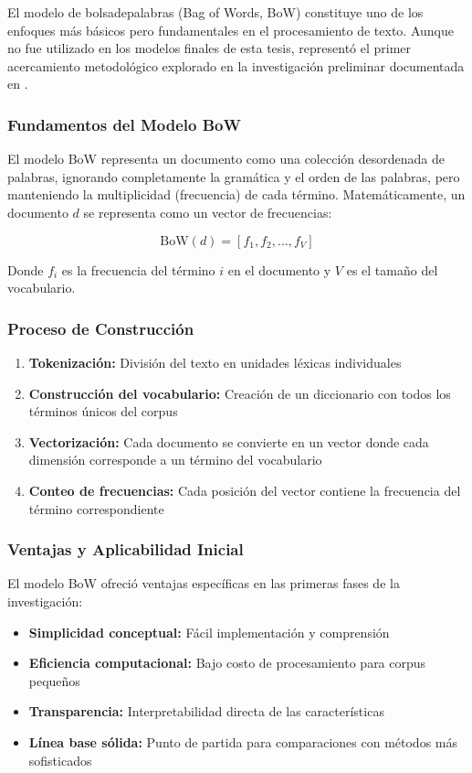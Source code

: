 El modelo de \gls{bolsadepalabras} (Bag of Words, BoW) constituye uno de los enfoques más básicos pero fundamentales en el procesamiento de texto. Aunque no fue utilizado en los modelos finales de esta tesis, representó el primer acercamiento metodológico explorado en la investigación preliminar documentada en \cite{hurtado2024calibracion}.

\subsubsection{Fundamentos del Modelo BoW}

El modelo BoW representa un documento como una colección desordenada de palabras, ignorando completamente la gramática y el orden de las palabras, pero manteniendo la multiplicidad (frecuencia) de cada término. Matemáticamente, un documento $d$ se representa como un vector de frecuencias:

\begin{equation}
\text{BoW}(d) = [f_1, f_2, ..., f_V]
\end{equation}

Donde $f_i$ es la frecuencia del término $i$ en el documento y $V$ es el tamaño del vocabulario.

\subsubsection{Proceso de Construcción}

\begin{enumerate}
    \item \textbf{Tokenización:} División del texto en unidades léxicas individuales
    \item \textbf{Construcción del vocabulario:} Creación de un diccionario con todos los términos únicos del corpus
    \item \textbf{Vectorización:} Cada documento se convierte en un vector donde cada dimensión corresponde a un término del vocabulario
    \item \textbf{Conteo de frecuencias:} Cada posición del vector contiene la frecuencia del término correspondiente
\end{enumerate}

\subsubsection{Ventajas y Aplicabilidad Inicial}

El modelo BoW ofreció ventajas específicas en las primeras fases de la investigación:
\begin{itemize}
    \item \textbf{Simplicidad conceptual:} Fácil implementación y comprensión
    \item \textbf{Eficiencia computacional:} Bajo costo de procesamiento para corpus pequeños
    \item \textbf{Transparencia:} Interpretabilidad directa de las características
    \item \textbf{Línea base sólida:} Punto de partida para comparaciones con métodos más sofisticados
\end{itemize}


